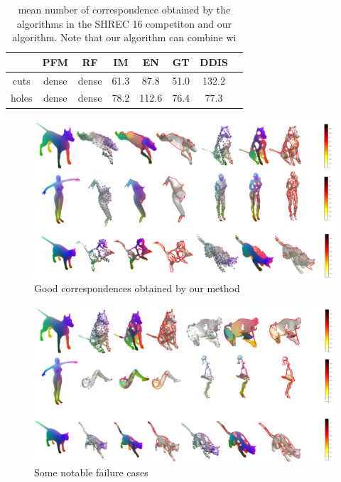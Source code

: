 \documentclass[10pt,twocolumn,letterpaper]{article}
\begin{document}
\begin{table}[h]
	\centering
	\begin{tabular}{c  c  c  c  c  c  c c} 
		\hline
		& PFM & RF & IM & EN & GT & DDIS  \\ \hline
		cuts & dense & dense & 61.3 & 87.8 & 51.0 & 132.2\\ \hline
		holes & dense & dense & 78.2 & 112.6 & 76.4 & 77.3 \\ \hline
		
	\end{tabular}
	\caption{mean number of correspondence obtained by the algorithms in the SHREC 16 competiton and our algorithm. Note that our algorithm can combine wi}
	\label{table:1}
\end{table}

\begin{figure}[htb]
	\centering

	\includegraphics[width=1\textwidth]{figures/success_1}
	\caption{Good correspondences obtained by our method}
\end{figure}


\begin{figure}[htb]
	\centering
	\includegraphics[width=1\textwidth]{figures/fail2.png}
	\caption{Some notable failure cases}
\end{figure}
{\small
	
	
}
\end{document}
